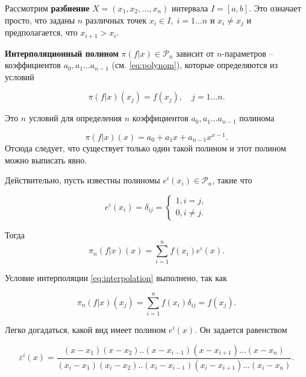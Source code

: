 Рассмотрим \textbf{разбиение} $X = (x_1, x_2, \dots , x_n)$ интервала $I = [a, b]$. Это означает просто, что заданы $n$ различных точек $x_i \in I, \; i = 1 \dots n$ и $x_i \neq x_j$ и предполагается, что $x_{i+1} > x_i$.

\textbf{Интерполяционный полином} $\pi(f|x) \in \mathscr{P}_n $ зависит от $n$-параметров -- коэффициентов $a_0, a_1 \dots a_{n-1}$ (см. \ref{eq:polynom}), которые определяются из условий

\begin{equation}\label{eq:interpolation}
\pi(f|x)(x_j) = f(x_j), \quad j = 1 \dots n.
\end{equation}

Это $n$ условий для определения $n$ коэффициентов  $a_0, a_1 \dots a_{n-1}$ полинома

\begin{equation}
\pi(f|x)(x) = a_0 + a_1x + a_{n-1}x^{x-1}.
\end{equation}
Отсюда следует, что существует только один такой полином и этот полином можно выписать явно. 

Действительно, пусть известны полиномы $e^i(x_i) \in \mathscr{P}_n $, такие что

\begin{equation}
e^i(x_i)= \delta_{ij} =
\begin{cases}
1, i = j, \\
0, i \neq j.

\end{cases}
\end{equation}

Тогда 
\begin{equation} \label{eq:2.19}
\pi_n(f|x)(x) = \sum_{i = 1}^{n} f(x_i)e^i(x).
\end{equation}

Условие интерполяции \ref{eq:interpolation} выполнено, так как 

\begin{equation}
\pi_n(f|x)(x_j) = \sum_{i = 1}^{n} f(x_i)\delta_{ij} = f(x_j).
\end{equation}

Легко догадаться, какой вид имеет полином $e^i(x)$. Он задается равенством 

\begin{equation} \label{eq:2.21}
\varepsilon^i(x) = \frac{(x-x_1)(x-x_2)..(x-x_{i-1})(x-x_{i+1}) \dots(x-x_n)}{(x_i-x_1)(x_i-x_2)..(x_i-x_{i-1})(x_i-x_{i+1})\dots(x_i - x_n )}.
\end{equation}

